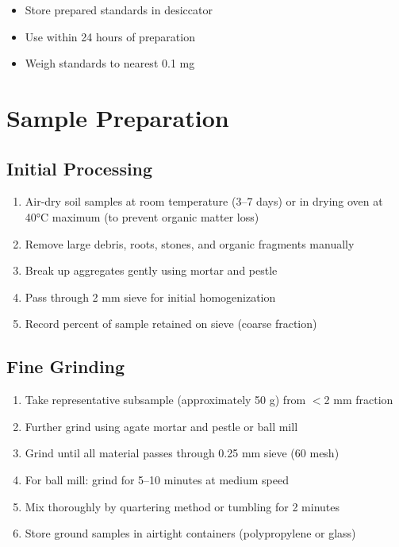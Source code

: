 \documentclass[11pt,a4paper]{article}\usepackage[]{graphicx}\usepackage[]{xcolor}
\begin{document}
\begin{itemize}[noitemsep]
    \item Store prepared standards in desiccator
    \item Use within 24 hours of preparation
    \item Weigh standards to nearest 0.1 mg
\end{itemize}

\section{Sample Preparation}

\subsection{Initial Processing}
\begin{enumerate}[noitemsep]
    \item Air-dry soil samples at room temperature (3--7 days) or in drying oven at 40°C maximum (to prevent organic matter loss)
    \item Remove large debris, roots, stones, and organic fragments manually
    \item Break up aggregates gently using mortar and pestle
    \item Pass through 2 mm sieve for initial homogenization
    \item Record percent of sample retained on sieve (coarse fraction)
\end{enumerate}

\subsection{Fine Grinding}
\begin{enumerate}[noitemsep]
    \item Take representative subsample (approximately 50 g) from $<$2 mm fraction
    \item Further grind using agate mortar and pestle or ball mill
    \item Grind until all material passes through 0.25 mm sieve (60 mesh)
    \item For ball mill: grind for 5--10 minutes at medium speed
    \item Mix thoroughly by quartering method or tumbling for 2 minutes
    \item Store ground samples in airtight containers (polypropylene or glass)
\end{enumerate}
\end{document}
